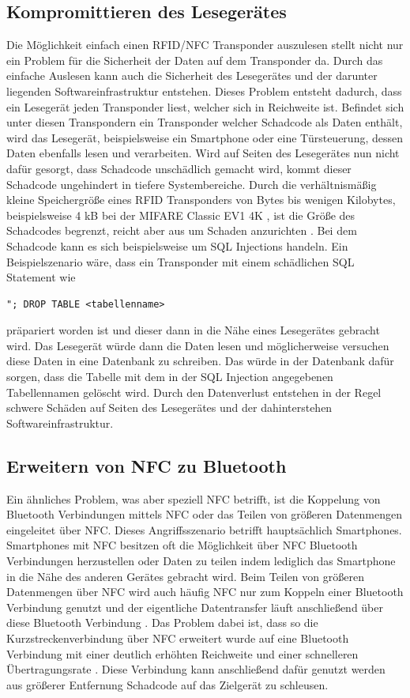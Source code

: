 \documentclass[conference]{IEEEtran}
\begin{document}
\subsection{Kom­pro­mit­tie­ren des Lesegerätes}
Die Möglichkeit einfach einen RFID/NFC Transponder auszulesen stellt nicht nur ein Problem für die Sicherheit der Daten auf dem Transponder da. Durch das einfache Auslesen kann auch die Sicherheit des Lesegerätes und der darunter liegenden Softwareinfrastruktur entstehen. Dieses Problem entsteht dadurch, dass ein Lesegerät jeden Transponder liest, welcher sich in Reichweite ist. Befindet sich unter diesen Transpondern ein Transponder welcher Schadcode als Daten enthält, wird das Lesegerät, beispielsweise ein Smartphone oder eine Türsteuerung, dessen Daten ebenfalls lesen und verarbeiten. Wird auf Seiten des Lesegerätes nun nicht dafür gesorgt, dass Schadcode unschädlich gemacht wird, kommt dieser Schadcode ungehindert in tiefere Systembereiche.
Durch die verhältnismäßig kleine Speichergröße eines RFID Transponders von Bytes bis wenigen Kilobytes, beispielsweise 4 kB bei der MIFARE Classic EV1 4K \cite{b4}, ist die Größe des Schadcodes begrenzt, reicht aber aus um Schaden anzurichten \cite{b5}. Bei dem Schadcode kann es sich beispielsweise um SQL Injections handeln. Ein Beispielszenario wäre, dass ein Transponder mit einem schädlichen SQL Statement wie
\begin{lstlisting}
"; DROP TABLE <tabellenname>
\end{lstlisting}
\cite{b5} präpariert worden ist und dieser dann in die Nähe eines Lesegerätes gebracht wird. Das Lesegerät würde dann die Daten lesen und möglicherweise versuchen diese Daten in eine Datenbank zu schreiben. Das würde in der Datenbank dafür sorgen, dass die Tabelle mit dem in der SQL Injection angegebenen Tabellennamen gelöscht wird. Durch den Datenverlust entstehen in der Regel schwere Schäden auf Seiten des Lesegerätes und der dahinterstehen Softwareinfrastruktur.

\subsection{Erweitern von NFC zu Bluetooth}
Ein ähnliches Problem, was aber speziell NFC betrifft, ist die Koppelung von Bluetooth Verbindungen mittels NFC oder das Teilen von größeren Datenmengen eingeleitet über NFC. Dieses Angriffsszenario betrifft hauptsächlich Smartphones. Smartphones mit NFC besitzen oft die Möglichkeit über NFC Bluetooth Verbindungen herzustellen oder Daten zu teilen indem lediglich das Smartphone in die Nähe des anderen Gerätes gebracht wird. Beim Teilen von größeren Datenmengen über NFC wird auch häufig NFC nur zum Koppeln einer Bluetooth Verbindung genutzt und der eigentliche Datentransfer läuft anschließend über diese Bluetooth Verbindung \cite{b6}. Das Problem dabei ist, dass so die Kurzstreckenverbindung über NFC erweitert wurde auf eine Bluetooth Verbindung mit einer deutlich erhöhten Reichweite und einer schnelleren Übertragungsrate \cite{b6}. Diese Verbindung kann anschließend dafür genutzt werden aus größerer Entfernung Schadcode auf das Zielgerät zu schleusen.
\end{document}
